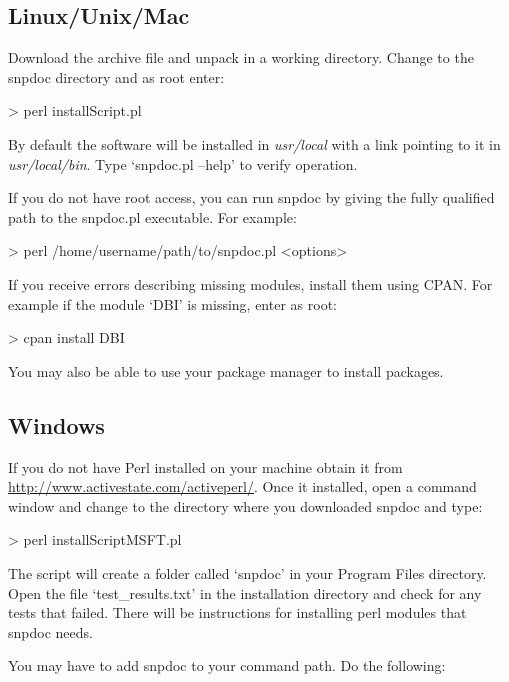 \documentclass[11pt]{article}
\begin{document}
\subsection{Linux/Unix/Mac}
\label{sec-3-1}


   Download the archive file and unpack in a working directory.  Change to the
   snpdoc directory and as root enter:

   > perl installScript.pl

   By default the software will be installed in \emph{usr/local} with a link pointing
   to it in \emph{usr/local/bin}.  Type `snpdoc.pl --help' to verify operation.

   If you do not have root access, you can run snpdoc by giving the fully
   qualified path to the snpdoc.pl executable.  For example:

   > perl /home/username/path/to/snpdoc.pl <options>

   If you receive errors describing missing modules, install them using CPAN.
   For example if the module `DBI' is missing, enter as root:

   > cpan install DBI

   You may also be able to use your package manager to install packages.
\subsection{Windows}
\label{sec-3-2}


   If you do not have Perl installed on your machine obtain it from \\
   \href{http://www.activestate.com/activeperl/}{http://www.activestate.com/activeperl/}.
   Once it installed, open a command window and change to the directory
   where you downloaded snpdoc and type:

   > perl installScriptMSFT.pl

   The script will create a folder called `snpdoc' in your Program Files
   directory.  Open the file `test\_results.txt' in the installation directory
   and check for any tests that failed.  There will be instructions for
   installing perl modules that snpdoc needs.

   You may have to add snpdoc to your command path.  Do the following:
\end{document}
